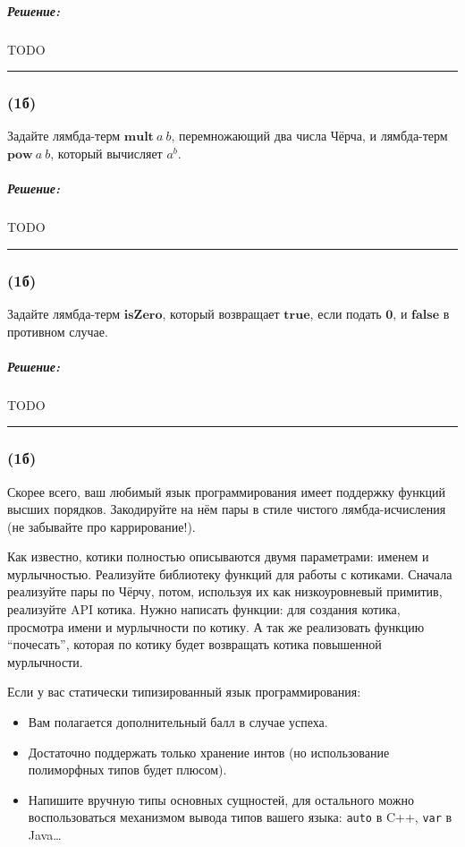 \documentclass{article}
\newenvironment{proof}{\subparagraph{\hspace{-1em}Решение:\newline}}{\par\noindent\rule{\textwidth}{0.4pt}}
\newcommand{\term}[1]{\mathbf{#1}}
\begin{document}
    \begin{proof}
        TODO %
    \end{proof}

    \subsubsection{(1б)}

    Задайте лямбда-терм $\term{mult}~a~b$, перемножающий два числа Чёрча, и лямбда-терм $\term{pow}~a~b$, который вычисляет $a^b$.

    \begin{proof}
        TODO %
    \end{proof}

    \subsubsection{(1б)}

    Задайте лямбда-терм $\term{isZero}$, который возвращает $\term{true}$, если подать $\term{0}$, и $\term{false}$ в противном случае.

    \begin{proof}
        TODO %
    \end{proof}

    \subsubsection{(1б)}

    Скорее всего, ваш любимый язык программирования имеет поддержку функций высших порядков.
    Закодируйте на нём пары в стиле чистого лямбда-исчисления (не забывайте про каррирование!).

    Как известно, котики полностью описываются двумя параметрами: именем и мурлычностью.
    Реализуйте библиотеку функций для работы с котиками.
    Сначала реализуйте пары по Чёрчу, потом, используя их как низкоуровневый примитив, реализуйте API котика.
    Нужно написать функции: для создания котика, просмотра имени и мурлычности по котику.
    А так же реализовать функцию ``почесать'', которая по котику будет возвращать котика повышенной мурлычности.

    Если у вас статически типизированный язык программирования:
    \begin{itemize}
        \item Вам полагается дополнительный балл в случае успеха.
        \item Достаточно поддержать только хранение интов (но использование полиморфных типов будет плюсом).
        \item Напишите вручную типы основных сущностей, для остального можно воспользоваться механизмом вывода типов вашего языка: \texttt{auto} в C++, \texttt{var} в Java\ldots
    \end{itemize}
\end{document}
